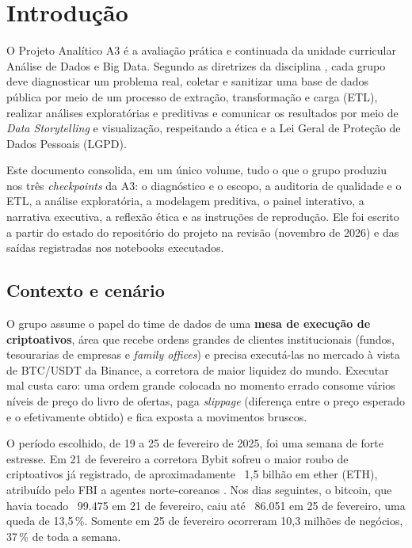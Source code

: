 \chapter{Introdução}\label{cap:introducao}

O Projeto Analítico A3 é a avaliação prática e continuada da unidade curricular
Análise de Dados e Big Data. Segundo as diretrizes da disciplina
\cite{usjt2026}, cada grupo deve diagnosticar um problema real, coletar e
sanitizar uma base de dados pública por meio de um processo de extração,
transformação e carga (ETL), realizar análises exploratórias e preditivas e
comunicar os resultados por meio de \textit{Data Storytelling} e visualização,
respeitando a ética e a Lei Geral de Proteção de Dados Pessoais (LGPD).

Este documento consolida, em um único volume, tudo o que o grupo produziu nos
três \textit{checkpoints} da A3: o diagnóstico e o escopo, a auditoria de
qualidade e o ETL, a análise exploratória, a modelagem preditiva, o painel
interativo, a narrativa executiva, a reflexão ética e as instruções de
reprodução. Ele foi escrito a partir do estado do repositório do projeto na
revisão  (novembro de 2026) e das saídas registradas nos
notebooks executados.

\section{Contexto e cenário}\label{sec:contexto}

O grupo assume o papel do time de dados de uma \textbf{mesa de execução de
criptoativos}, área que recebe ordens grandes de clientes institucionais
(fundos, tesourarias de empresas e \textit{family offices}) e precisa
executá-las no mercado à vista de BTC/USDT da Binance, a corretora de maior
liquidez do mundo. Executar mal custa caro: uma ordem grande colocada no
momento errado consome vários níveis de preço do livro de ofertas, paga
\textit{slippage} (diferença entre o preço esperado e o efetivamente obtido) e
fica exposta a movimentos bruscos.

O período escolhido, de 19 a 25 de fevereiro de 2025, foi uma semana de forte
estresse. Em 21 de fevereiro a corretora Bybit sofreu o maior roubo de
criptoativos já registrado, de aproximadamente \usd~1,5 bilhão em ether (ETH),
atribuído pelo FBI a agentes norte-coreanos \cite{fbi2025}. Nos dias seguintes,
o bitcoin, que havia tocado \usd~99.475 em 21 de fevereiro, caiu até
\usd~86.051 em 25 de fevereiro, uma queda de 13,5\,\%. Somente em 25 de
fevereiro ocorreram 10,3 milhões de negócios, 37\,\% de toda a semana.

